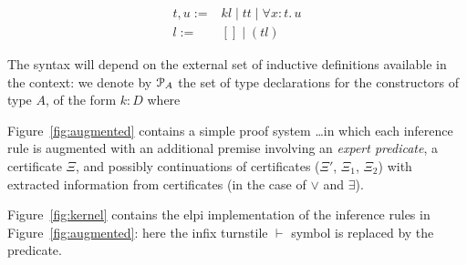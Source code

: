\begin{align*}
t,u :=& k l \;|\; t t \;|\; \forall x : t.\, u \\
l :=& [] \;|\; (t l)
\end{align*}

The syntax will depend on the external set of inductive definitions available
in the context: we denote by ${\mathcal P}_A$ the set of type declarations for the
constructors of type $A$, of the form $k : D$ where

Figure~\ref{fig:augmented} contains a simple proof system \dots  in which each inference rule is augmented with an
additional premise involving an \emph{expert predicate}, a
certificate $\Xi$, and possibly continuations of certificates ($\Xi'$,
$\Xi_1$, $\Xi_2$) with extracted information from certificates (in the
case of $\vee$ and $\exists$).
%
%
%

Figure~\ref{fig:kernel} contains the elpi implementation of the
inference rules in Figure~\ref{fig:augmented}: here the infix
turnstile $\vdash$ symbol is replaced by the  predicate.
%


